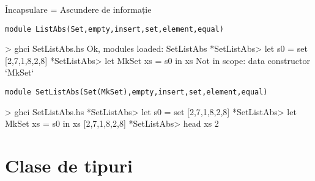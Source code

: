 \documentclass[xcolor=pdftex,romanian,colorlinks]{beamer}
\begin{document}
\begin{frame}[fragile]{Încapsulare = Ascundere de informație}
\begin{block}{\lstinline"module ListAbs(Set,empty,insert,set,element,equal)"}
\begin{asciihs}
> ghci SetListAbs.hs
Ok, modules loaded: SetListAbs
*SetListAbs> let s0 = set [2,7,1,8,2,8]
*SetListAbs> let MkSet xs = s0 in xs
Not in scope: data constructor `MkSet`
\end{asciihs}
\end{block}
\begin{block}{\lstinline"module SetListAbs(Set(MkSet),empty,insert,set,element,equal)"}
\begin{asciihs}
> ghci SetListAbs.hs
*SetListAbs> let s0 = set [2,7,1,8,2,8]
*SetListAbs> let MkSet xs = s0 in xs 
[2,7,1,8,2,8]
*SetListAbs> head xs
2
\end{asciihs}
\end{block}
\end{frame}
%
%
%
%
%
%

\section{Clase de tipuri}
\end{document}
